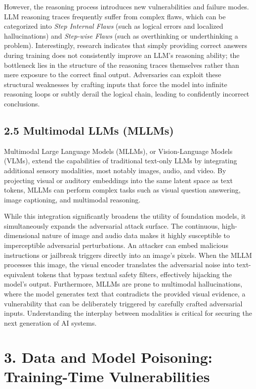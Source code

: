 \documentclass[11pt,a4paper]{article}
\begin{document}
However, the reasoning process introduces new vulnerabilities and failure modes. LLM reasoning traces frequently suffer from complex flaws, which can be categorized into \textit{Step Internal Flaws} (such as logical errors and localized hallucinations) and \textit{Step-wise Flaws} (such as overthinking or underthinking a problem). Interestingly, research indicates that simply providing correct answers during training does not consistently improve an LLM's reasoning ability; the bottleneck lies in the structure of the reasoning traces themselves rather than mere exposure to the correct final output. Adversaries can exploit these structural weaknesses by crafting inputs that force the model into infinite reasoning loops or subtly derail the logical chain, leading to confidently incorrect conclusions.

\subsection{2.5 Multimodal LLMs (MLLMs)}

Multimodal Large Language Models (MLLMs), or Vision-Language Models (VLMs), extend the capabilities of traditional text-only LLMs by integrating additional sensory modalities, most notably images, audio, and video. By projecting visual or auditory embeddings into the same latent space as text tokens, MLLMs can perform complex tasks such as visual question answering, image captioning, and multimodal reasoning.

While this integration significantly broadens the utility of foundation models, it simultaneously expands the adversarial attack surface. The continuous, high-dimensional nature of image and audio data makes it highly susceptible to imperceptible adversarial perturbations. An attacker can embed malicious instructions or jailbreak triggers directly into an image's pixels. When the MLLM processes this image, the visual encoder translates the adversarial noise into text-equivalent tokens that bypass textual safety filters, effectively hijacking the model's output. Furthermore, MLLMs are prone to multimodal hallucinations, where the model generates text that contradicts the provided visual evidence, a vulnerability that can be deliberately triggered by carefully crafted adversarial inputs. Understanding the interplay between modalities is critical for securing the next generation of AI systems.

\section{3. Data and Model Poisoning: Training-Time Vulnerabilities}
\end{document}
